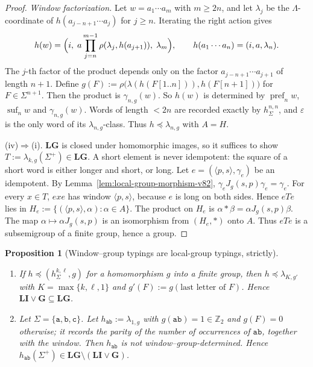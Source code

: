 \documentclass[11pt]{article}
\numberwithin{equation}{section}
\theoremstyle{plain}
\newtheorem{proposition}[theorem]{Proposition}
\theoremstyle{definition}
\theoremstyle{remark}
\newcommand{\eps}{\varepsilon}
\theoremstyle{plain}
\begin{document}
\begin{proof}
\emph{Window factorization.}  Let $w=a_1\cdots a_m$ with $m\ge2n$, and
let $\lambda_j$ be the $\Lambda$-coordinate of $h(a_{j-n+1}\cdots a_j)$
for $j\ge n$.  Iterating the right action gives
\[
 h(w)=\Bigl(i,\;a\prod_{j=n}^{m-1}\rho(\lambda_j,h(a_{j+1})),\;
 \lambda_m\Bigr),
 \qquad h(a_1\cdots a_n)=(i,a,\lambda_n).
\]
The $j$-th factor of the product depends only on the factor
$a_{j-n+1}\cdots a_{j+1}$ of length $n+1$.  Define
$g(F):=\rho\bigl(\lambda(h(F[1..n])),h(F[n+1])\bigr)$ for
$F\in\Sigma^{n+1}$.  Then the product is $\gamma_{n,g}(w)$.  So $h(w)$
is determined by $\operatorname{pref}_n w$, $\operatorname{suf}_n w$ and
$\gamma_{n,g}(w)$.  Words of length $<2n$ are recorded exactly by
$h^{n,n}_\Sigma$, and $\eps$ is the only word of its
$\lambda_{n,g}$-class.  Thus $h\preceq\lambda_{n,g}$ with $A=H$.

(iv)$\Rightarrow$(i).  $\mathbf{LG}$ is closed under homomorphic images,
so it suffices to show $T:=\lambda_{k,g}(\Sigma^+)\in\mathbf{LG}$.  A
short element is never idempotent: the square of a short word is
either longer and short, or long.  Let
$e=(\langle p,s\rangle,\gamma_e)$ be an idempotent.  By
Lemma~\ref{lem:local-group-morphism-v82}, $\gamma_eJ_g(s,p)\gamma_e=\gamma_e$.
For every $x\in T$, $exe$ has window $\langle p,s\rangle$, because $e$
is long on both sides.  Hence $eTe$ lies in
$H_e:=\{(\langle p,s\rangle,\alpha):\alpha\in A\}$.  The product on
$H_e$ is $\alpha*\beta=\alpha J_g(s,p)\beta$.  The map
$\alpha\mapsto\alpha J_g(s,p)$ is an isomorphism from $(H_e,*)$ onto
$A$.  Thus $eTe$ is a subsemigroup of a finite group, hence a group.
\end{proof}

\begin{proposition}[Window--group typings are local-group typings, strictly]
\label{prop:li-g-strict-v82}
\begin{enumerate}[label=\textup{(\roman*)},leftmargin=*]
\item If $h\preceq(h^{k,\ell}_\Sigma,g)$ for a homomorphism $g$ into a
finite group, then $h\preceq\lambda_{K,g'}$ with $K=\max\{k,\ell,1\}$
and $g'(F):=g(\text{last letter of }F)$.  Hence
$\mathbf{LI}\vee\mathbf G\subseteq\mathbf{LG}$.
\item Let $\Sigma=\{\mathtt a,\mathtt b,\mathtt c\}$.  Let
$h_{\mathtt{ab}}:=\lambda_{1,g}$ with $g(\mathtt{ab})=1\in\mathbb Z_2$
and $g(F)=0$ otherwise; it records the parity of the number of
occurrences of $\mathtt{ab}$, together with the window.  Then
$h_{\mathtt{ab}}$ is not window--group-determined.  Hence
$h_{\mathtt{ab}}(\Sigma^+)\in\mathbf{LG}\setminus(\mathbf{LI}\vee\mathbf G)$.
\end{enumerate}
\end{proposition}
\end{document}
